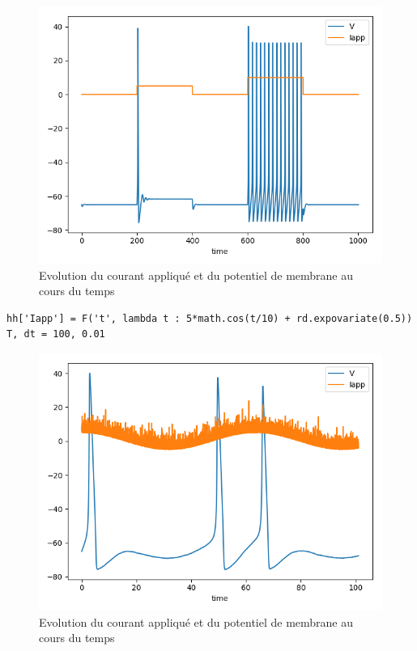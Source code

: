 \documentclass[12pt]{scrartcl}
\begin{document}
\begin{figure}[!h]
\centering
\includegraphics[scale=0.8]{imgs/hh31.png}
\caption{Evolution du courant appliqué et du potentiel de membrane au cours du temps}
\label{hh31}
\end{figure}

\clearpage
\begin{lstlisting}[caption = {Simulation du modèle 4}]
hh['Iapp'] = F('t', lambda t : 5*math.cos(t/10) + rd.expovariate(0.5))
T, dt = 100, 0.01
\end{lstlisting}

\begin{figure}[!h]
\centering
\includegraphics[scale=0.8]{imgs/hh41.png}
\caption{Evolution du courant appliqué et du potentiel de membrane au cours du temps}
\label{hh41}
\end{figure}
\end{document}
